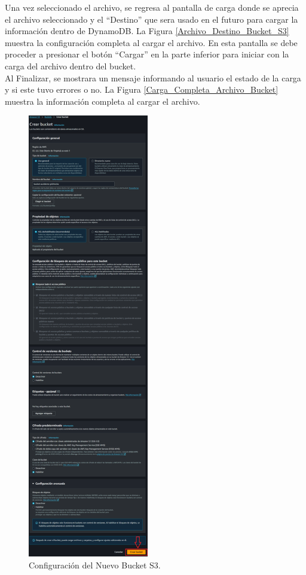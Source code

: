 \documentclass[a4paper,10pt, oneside, titlepage]{article}
\begin{document}
	\indent Una vez seleccionado el archivo, se regresa al pantalla de carga donde se aprecia el archivo seleccionado y el ``Destino'' que sera usado en el futuro para cargar la información dentro de DynamoDB. La Figura \ref{Archivo_Destino_Bucket_S3} muestra la configuración completa al cargar el archivo. En esta pantalla se debe proceder a presionar el botón ``Cargar'' en la parte inferior para iniciar con la carga del archivo dentro del bucket. \\\newline
	\indent Al Finalizar, se mostrara un mensaje informando al usuario el estado de la carga y si este tuvo errores o no. La Figura \ref{Carga_Completa_Archivo_Bucket} muestra la información completa al cargar el archivo. 
	\begin{figure}[!h]
		\centering
		\includegraphics[width = 1\linewidth, height = 19.5cm]{Configuracion_Nuevo_Bucket_S3.png}
		\caption{Configuración del Nuevo Bucket S3.}
		\label{Configuracion_Nuevo_Bucket_S3}
	\end{figure}
\end{document}
